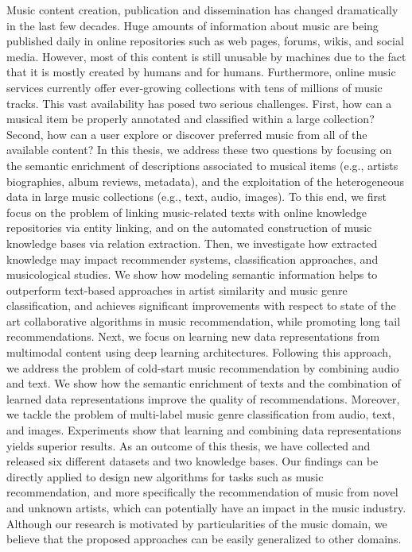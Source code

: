 Music content creation, publication and dissemination has changed dramatically in the last few decades. Huge amounts of information about music are being published daily in online repositories such as web pages, forums, wikis, and social media. However, most of this content is still unusable by machines due to the fact that it is mostly created by humans and for humans. Furthermore, online music services currently offer ever-growing collections with tens of millions of music tracks. This vast availability has posed two serious challenges. First, how can a musical item be properly annotated and classified within a large collection? Second, how can a user explore or discover preferred music from all of the available content? In this thesis, we address these two questions by focusing on the semantic enrichment of descriptions associated to musical items (e.g., artists biographies, album reviews, metadata), and the exploitation of the heterogeneous data in large music collections (e.g., text, audio, images). To this end, we first focus on the problem of linking music-related texts with online knowledge repositories via entity linking, and on the automated construction of music knowledge bases via relation extraction. Then, we investigate how extracted knowledge may impact recommender systems, classification approaches, and musicological studies. We show how modeling semantic information helps to outperform text-based approaches in artist similarity and music genre classification, and achieves significant improvements with respect to state of the art collaborative algorithms in music recommendation, while promoting long tail recommendations. Next, we focus on learning new data representations from multimodal content using deep learning architectures. Following this approach, we address the problem of cold-start music recommendation by combining audio and text. We show how the semantic enrichment of texts and the combination of learned data representations improve the quality of recommendations. Moreover, we tackle the problem of multi-label music genre classification from audio, text, and images. Experiments show that learning and combining data representations yields superior results. As an outcome of this thesis, we have collected and released six different datasets and two knowledge bases. Our findings can be directly applied to design new algorithms for tasks such as music recommendation, and more specifically the recommendation of music from novel and unknown artists, which can potentially have an impact in the music industry. Although our research is motivated by particularities of the music domain, we believe that the proposed approaches can be easily generalized to other domains.
